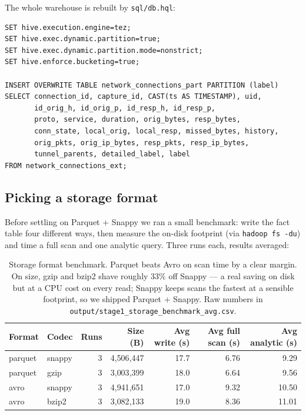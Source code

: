 \documentclass[11pt,a4paper]{article}
\begin{document}
The whole warehouse is rebuilt by \texttt{sql/db.hql}:

\begin{lstlisting}
SET hive.execution.engine=tez;
SET hive.exec.dynamic.partition=true;
SET hive.exec.dynamic.partition.mode=nonstrict;
SET hive.enforce.bucketing=true;

INSERT OVERWRITE TABLE network_connections_part PARTITION (label)
SELECT connection_id, capture_id, CAST(ts AS TIMESTAMP), uid,
       id_orig_h, id_orig_p, id_resp_h, id_resp_p,
       proto, service, duration, orig_bytes, resp_bytes,
       conn_state, local_orig, local_resp, missed_bytes, history,
       orig_pkts, orig_ip_bytes, resp_pkts, resp_ip_bytes,
       tunnel_parents, detailed_label, label
FROM network_connections_ext;
\end{lstlisting}

\subsection{Picking a storage format}

Before settling on Parquet + Snappy we ran a small benchmark: write the
fact table four different ways, then measure the on-disk footprint
(via \texttt{hadoop fs -du}) and time a full scan and one analytic
query. Three runs each, results averaged:

\begin{table}[H]
\centering
\small
\begin{tabular}{llrrrrr}
\toprule
\textbf{Format} & \textbf{Codec} & \textbf{Runs} & \textbf{Size (B)} & \textbf{Avg write (s)} & \textbf{Avg full scan (s)} & \textbf{Avg analytic (s)} \\
\midrule
parquet & snappy & 3 & 4{,}506{,}447 & 17.7 & 6.76 & 9.29 \\
parquet & gzip   & 3 & 3{,}003{,}399 & 18.0 & 6.64 & 9.56 \\
avro    & snappy & 3 & 4{,}941{,}651 & 17.0 & 9.32 & 10.50 \\
avro    & bzip2  & 3 & 3{,}082{,}133 & 19.0 & 8.36 & 11.01 \\
\bottomrule
\end{tabular}
\caption{Storage format benchmark. Parquet beats Avro on scan time by
a clear margin. On size, gzip and bzip2 shave roughly $33\%$ off Snappy
--- a real saving on disk but at a CPU cost on every read; Snappy keeps
scans the fastest at a sensible footprint, so we shipped Parquet +
Snappy. Raw numbers in
\texttt{output/stage1\_storage\_benchmark\_avg.csv}.}
\end{table}
\end{document}
